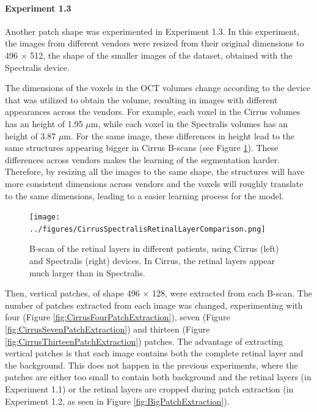 \paragraph{Experiment 1.3}
Another patch shape was experimented in Experiment 1.3. In this experiment, the images from different vendors were resized from their original dimensions to 496 $\times$ 512, the shape of the smaller images of the dataset, obtained with the Spectralis device. 
\par
The dimensions of the voxels in the OCT volumes change according to the device that was utilized to obtain the volume, resulting in images with different appearances across the vendors. For example, each voxel in the Cirrus volumes has an height of 1.95 $\mu$m, while each voxel in the Spectralis volumes has an height of 3.87 $\mu$m. For the same image, these differences in height lead to the same structures appearing bigger in Cirrus B-scans (see Figure \ref{fig:CirrusSpectralisRetinalLayerComparison}). These differences across vendors makes the learning of the segmentation harder. Therefore, by resizing all the images to the same shape, the structures will have more consistent dimensions across vendors and the voxels will roughly translate to the same dimensions, leading to a easier learning process for the model.

\begin{figure}[!ht]
	\centering
	\texttt{[image: ../figures/CirrusSpectralisRetinalLayerComparison.png]}
	\caption{B-scan of the retinal layers in different patients, using Cirrus (left) and Spectralis (right) devices. In Cirrus, the retinal layers appear much larger than in Spectralis.}
	\label{fig:CirrusSpectralisRetinalLayerComparison}
\end{figure}

Then, vertical patches, of shape 496 $\times$ 128, were extracted from each B-scan. The number of patches extracted from each image was changed, experimenting with four (Figure \ref{fig:CirrusFourPatchExtraction}), seven (Figure \ref{fig:CirrusSevenPatchExtraction}) and thirteen (Figure \ref{fig:CirrusThirteenPatchExtraction}) patches. The advantage of extracting vertical patches is that each image contains both the complete retinal layer and the background. This does not happen in the previous experiments, where the patches are either too small to contain both background and the retinal layers (in Experiment 1.1) or the retinal layers are cropped during patch extraction (in Experiment 1.2, as seen in Figure \ref{fig:BigPatchExtraction}).

